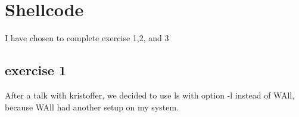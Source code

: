 \documentclass{article}
\begin{document}

\clearpage\maketitle
\thispagestyle{empty}

\newpage
\section{Shellcode}
I have chosen to complete exercise 1,2, and 3
\subsection{exercise 1}
After a talk with kristoffer, we decided to use ls with option -l instead of WAll, because WAll had another setup on my system. 
\end{document}
